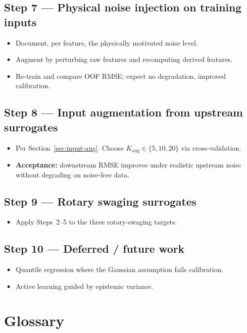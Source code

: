 \documentclass[11pt,a4paper]{article}
\begin{document}
\subsection*{Step 7 --- Physical noise injection on training inputs}
\begin{itemize}
    \item Document, per feature, the physically motivated noise level.
    \item Augment by perturbing raw features and recomputing derived features.
    \item Re-train and compare OOF RMSE; expect no degradation, improved calibration.
\end{itemize}

\subsection*{Step 8 --- Input augmentation from upstream surrogates}
\begin{itemize}
    \item Per Section~\ref{sec:input-aug}. Choose $K_{\text{aug}} \in \{5, 10, 20\}$ via cross-validation.
    \item \textbf{Acceptance:} downstream RMSE improves under realistic upstream noise without degrading on noise-free data.
\end{itemize}

\subsection*{Step 9 --- Rotary swaging surrogates}
\begin{itemize}
    \item Apply Steps~2--5 to the three rotary-swaging targets.
\end{itemize}

\subsection*{Step 10 --- Deferred / future work}
\begin{itemize}
    \item Quantile regression where the Gaussian assumption fails calibration.
    \item Active learning guided by epistemic variance.
\end{itemize}

\section*{Glossary}
\end{document}
